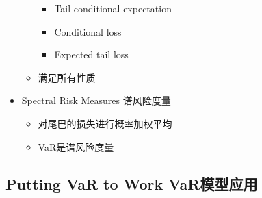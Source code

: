 \documentclass[a4paper,6pt,twoside,openany]{article}
\begin{document}
\begin{itemize}
\begin{itemize}
\begin{itemize}
    \item Tail conditional expectation
    \item Conditional loss
    \item Expected tail loss
    \end{itemize}
  \item 满足所有性质
  \end{itemize}
\item Spectral Risk Measures 谱风险度量
  \begin{itemize}
  \item 对尾巴的损失进行概率加权平均
  \item VaR是谱风险度量
  \end{itemize}
\end{itemize}

\subsection{Putting VaR to Work VaR模型应用}
\end{document}
